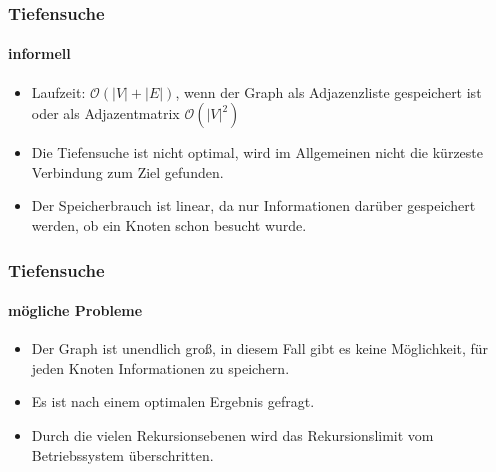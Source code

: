 
\begin{frame}
	\frametitle{Tiefensuche}
	\framesubtitle{informell}
	\begin{itemize}
		\item Laufzeit: $\mathcal{O}(|V| + |E|)$, wenn der Graph als Adjazenzliste gespeichert ist oder als Adjazentmatrix $\mathcal{O}(|V|^2)$
		\item Die Tiefensuche ist nicht optimal, wird im Allgemeinen nicht die kürzeste Verbindung zum Ziel gefunden.
		\item Der Speicherbrauch ist linear, da nur Informationen darüber gespeichert werden, ob ein Knoten schon besucht wurde.
	\end{itemize}
\end{frame}

\begin{frame}
		\frametitle{Tiefensuche}
		\framesubtitle{mögliche Probleme}
		\begin{itemize}
			\item Der Graph ist unendlich groß, in diesem Fall gibt es keine Möglichkeit, für jeden Knoten Informationen zu speichern.
			\item Es ist nach einem optimalen Ergebnis gefragt.
			\item Durch die vielen Rekursionsebenen wird das Rekursionslimit vom Betriebssystem überschritten.
		\end{itemize}
\end{frame}

